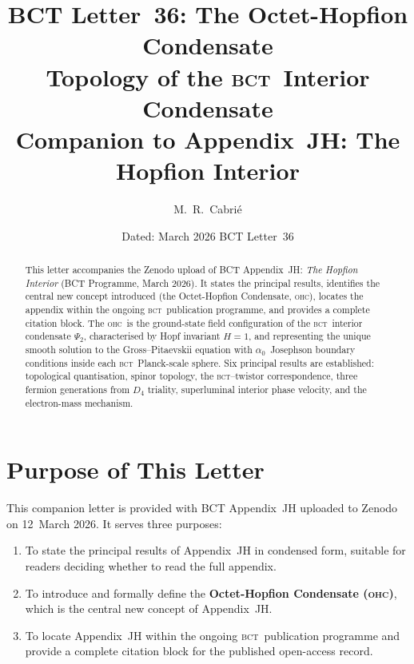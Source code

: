 \documentclass[aps,prl,twocolumn,superscriptaddress,floatfix]{revtex4-2}
\newcommand{\az}{\alpha_0}
\newcommand{\BCT}{\textsc{bct}}
\newcommand{\OHC}{\textsc{ohc}}
\newcommand{\Psiint}{\Psi_2}
\newcommand{\HopfN}{H}
\begin{document}
\title{%
  BCT Letter~36: The Octet-Hopfion Condensate\\
  Topology of the \BCT\ Interior Condensate\\
  \normalsize{Companion to Appendix~JH: The Hopfion Interior}
}

\author{M.~R.~Cabri\'{e}}

\date{Dated: March 2026 \quad BCT Letter~36 }

\begin{abstract}
This letter accompanies the Zenodo upload of BCT Appendix~JH:
\textit{The Hopfion Interior} (BCT Programme, March 2026).
It states the principal results, identifies the central new concept
introduced (the Octet-Hopfion Condensate, \OHC), locates the appendix
within the ongoing \BCT\ publication programme, and provides a complete
citation block.
The \OHC\ is the ground-state field configuration of the \BCT\ interior
condensate $\Psiint$, characterised by Hopf invariant $\HopfN=1$,
and representing the unique smooth solution to the Gross--Pitaevskii
equation with $\az$~Josephson boundary conditions inside each \BCT\
Planck-scale sphere.
Six principal results are established: topological quantisation, spinor
topology, the \BCT--twistor correspondence, three fermion generations
from $D_4$ triality, superluminal interior phase velocity, and the
electron-mass mechanism.
\end{abstract}

\maketitle

\section{Purpose of This Letter}
\label{sec:purpose}

This companion letter is provided with BCT Appendix~JH uploaded to
Zenodo on 12~March 2026.
It serves three purposes:
\begin{enumerate}
\item[(a)] To state the principal results of Appendix~JH in condensed
  form, suitable for readers deciding whether to read the full appendix.
\item[(b)] To introduce and formally define the \textbf{Octet-Hopfion
  Condensate (\OHC)}, which is the central new concept of Appendix~JH.
\item[(c)] To locate Appendix~JH within the ongoing \BCT\ publication
  programme and provide a complete citation block for the published
  open-access record.
\end{enumerate}
\end{document}
